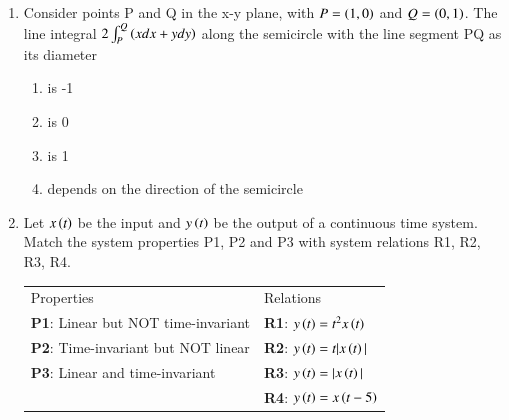\documentclass[a4paper, 11pt]{article}
\begin{document}
\begin{enumerate}
    \begin{enumerate}
    \end{enumerate}
    
    \hfill{}

    \item Consider points P and Q in the x-y plane, with $P=\left(1,0\right)$ and $Q=\left(0,1\right)$. The line integral $2\int_{P}^{Q}\left(xdx+ydy\right)$ along the semicircle with the line segment PQ as its diameter
    \begin{enumerate}
            \item is -1
            \item is 0
            \item is 1\textbf{}
            \item depends on the direction  of the semicircle
    \end{enumerate}
    
    \hfill{}

    \item Let $x\left(t\right)$ be the input and $y\left(t\right)$ be the output of a continuous time system. Match the system properties P1, P2 and P3 with system relations R1, R2, R3, R4.\\
    \begin{tabular}{ll}
        Properties & Relations\\
        \textbf{P1}: Linear but NOT time-invariant & \textbf{R1}: $y\left(t\right)=t^2x\left(t\right)$ \\
        \textbf{P2}: Time-invariant but NOT linear & \textbf{R2}: $y\left(t\right)=t|x\left(t\right)|$ \\
        \textbf{P3}: Linear and time-invariant & \textbf{R3}: $y\left(t\right)=|x\left(t\right)|$\\
         & \textbf{R4}: $y\left(t\right)=x\left(t-5\right)$
    \end{tabular}

    
    \begin{enumerate}
    \end{enumerate}
    

\end{enumerate}
\end{document}
